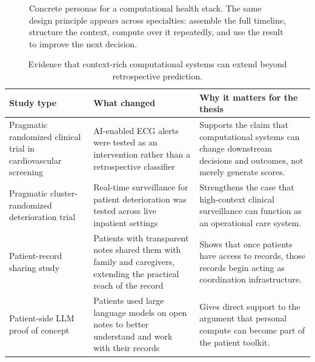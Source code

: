 \documentclass[11pt]{article}
\begin{document}
\begin{figure}[t]
\caption{Concrete personas for a computational health stack. The same design principle appears across specialties: assemble the full timeline, structure the context, compute over it repeatedly, and use the result to improve the next decision.}
\label{fig:personas}
\end{figure}

\begin{table}[t]
\centering
\small
\renewcommand{\arraystretch}{1.14}
\setlength{\tabcolsep}{4.5pt}
\begin{tabularx}{\textwidth}{>{\raggedright\arraybackslash}p{3.2cm} >{\raggedright\arraybackslash}p{4.2cm} >{\raggedright\arraybackslash}X}
\toprule
\textbf{Study type} & \textbf{What changed} & \textbf{Why it matters for the thesis} \\
\midrule
Pragmatic randomized clinical trial in cardiovascular screening & AI-enabled ECG alerts were tested as an intervention rather than a retrospective classifier \citep{lin2024} & Supports the claim that computational systems can change downstream decisions and outcomes, not merely generate scores. \\
Pragmatic cluster-randomized deterioration trial & Real-time surveillance for patient deterioration was tested across live inpatient settings \citep{moses2025} & Strengthens the case that high-context clinical surveillance can function as an operational care system. \\
Patient-record sharing study & Patients with transparent notes shared them with family and caregivers, extending the practical reach of the record \citep{jackson2014} & Shows that once patients have access to records, those records begin acting as coordination infrastructure. \\
Patient-side LLM proof of concept & Patients used large language models on open notes to better understand and work with their records \citep{salmi2025} & Gives direct support to the argument that personal compute can become part of the patient toolkit. \\
\bottomrule
\end{tabularx}
\caption{Evidence that context-rich computational systems can extend beyond retrospective prediction.}
\label{tab:intervention}
\end{table}
\end{document}
